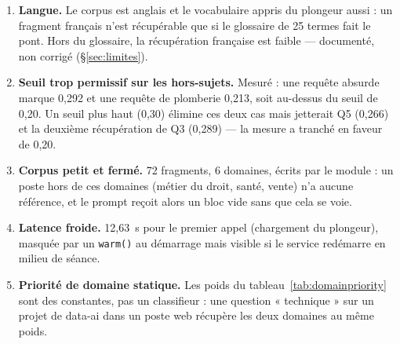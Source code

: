 \begin{enumerate}[label=\textbf{(\alph*)},leftmargin=*,itemsep=2pt]
  \item \textbf{Langue.} Le corpus est anglais et le vocabulaire appris du
        plongeur aussi : un fragment français n'est récupérable que si le
        glossaire de 25 termes fait le pont. Hors du glossaire, la récupération
        française est faible --- documenté, non corrigé (§\ref{sec:limites}).
  \item \textbf{Seuil trop permissif sur les hors-sujets.} Mesuré : une requête
        absurde marque 0,292 et une requête de plomberie 0,213, soit au-dessus
        du seuil de 0,20. Un seuil plus haut (0,30) élimine ces deux cas mais
        jetterait Q5 (0,266) et la deuxième récupération de Q3 (0,289) --- la
        mesure a tranché en faveur de 0,20.
  \item \textbf{Corpus petit et fermé.} 72 fragments, 6 domaines, écrits par le
        module : un poste hors de ces domaines (métier du droit, santé, vente)
        n'a aucune référence, et le prompt reçoit alors un bloc vide sans que
        cela se voie.
  \item \textbf{Latence froide.} 12,63~s pour le premier appel (chargement du
        plongeur), masquée par un \texttt{warm()} au démarrage mais visible si
        le service redémarre en milieu de séance.
  \item \textbf{Priorité de domaine statique.} Les poids du
        tableau~\ref{tab:domainpriority} sont des constantes, pas un classifieur
        : une question « technique » sur un projet de data-ai dans un poste web
        récupère les deux domaines au même poids.
\end{enumerate}

